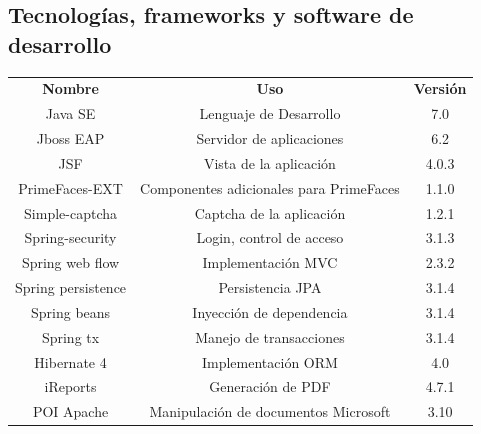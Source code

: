 \documentclass[../reportesINE.tex]{subfiles}
\begin{document}
\subsection{Tecnologías, frameworks y software de \\ desarrollo}
\begin{tabular}{ c c c }
 \textbf{Nombre} & \textbf{Uso} & \textbf{Versión} \\ 
 Java SE & Lenguaje de Desarrollo & 7.0 \\  
 Jboss EAP & Servidor de aplicaciones & 6.2 \\
 JSF & Vista de la aplicación & 4.0.3 \\
 PrimeFaces-EXT & Componentes adicionales para PrimeFaces & 1.1.0 \\
 Simple-captcha & Captcha de la aplicación & 1.2.1 \\
 Spring-security & Login, control de acceso & 3.1.3 \\
 Spring web flow & Implementación MVC & 2.3.2 \\
 Spring persistence & Persistencia JPA & 3.1.4 \\
 Spring beans & Inyección de dependencia & 3.1.4 \\
 Spring tx & Manejo de transacciones & 3.1.4 \\
 Hibernate 4 & Implementación ORM & 4.0 \\
 iReports & Generación de PDF & 4.7.1 \\
 POI Apache & Manipulación de documentos Microsoft & 3.10
\end{tabular}
\end{document}
